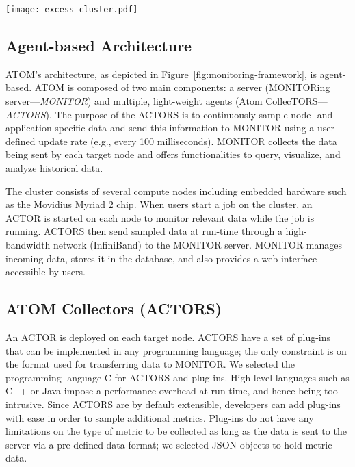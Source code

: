 \documentclass[10pt,letterpaper]{IEEEtran}
\begin{document}
\begin{figure*}[t]
  \centering
  \texttt{[image: excess\_cluster.pdf]}
  \caption{Architecture of the ATOM monitoring framework deployed on the EXCESS cluster
	}\label{fig:monitoring-framework}
\end{figure*}

\subsection{Agent-based Architecture}
ATOM's architecture, as depicted in Figure~\ref{fig:monitoring-framework}, is agent-based. ATOM is composed
of two main components: a server (MONITORing server---\textit{MONITOR}) and multiple, light-weight agents
(Atom CollecTORS---\textit{ACTORS}). The purpose of the ACTORS is to continuously sample node- and
application-specific data and send this information to MONITOR using a user-defined update rate
(e.g., every 100 milliseconds). MONITOR collects the data being sent by each target node and offers
functionalities to query, visualize, and analyze historical data.

The cluster consists of several compute nodes including embedded hardware such as the Movidius Myriad 2 chip.
	When users start a job on the cluster, an ACTOR is started on each node to monitor relevant data while the job
	is running. ACTORS then send sampled data at run-time through a high-bandwidth network (InfiniBand) to the
	MONITOR server. MONITOR manages incoming data, stores it in the database, and also provides a web interface
	accessible by users.

\subsection{ATOM Collectors (ACTORS)}
An ACTOR is deployed on each target node. ACTORS have a set of plug-ins that can be implemented in
any programming language; the only constraint is on the format used for transferring data to MONITOR.
We selected the programming language C for ACTORS and plug-ins. High-level languages such as C++ or
Java impose a performance overhead at run-time, and hence being too intrusive. Since ACTORS are
by default extensible, developers can add plug-ins with ease in order to sample additional metrics.
Plug-ins do not have any limitations on the type of metric to be collected as long as the data is sent
to the server via a pre-defined data format; we selected JSON objects to hold metric data.
\end{document}

